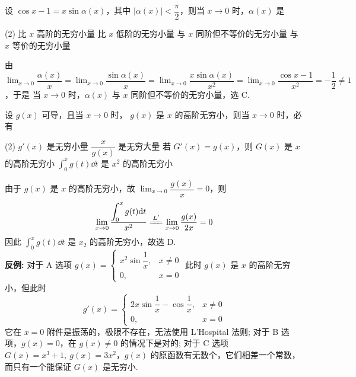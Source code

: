 \begin{example}
    设 $\cos x-1=x\sin\alpha(x)$，其中 $|\alpha(x)|<\dfrac{\pi}{2}$，则当 $x\to0$ 时，$\alpha(x)$ 是
    \begin{tasks}(2)
        \task 比 $x$ 高阶的无穷小量
        \task 比 $x$ 低阶的无穷小量
        \task 与 $x$ 同阶但不等价的无穷小量
        \task 与 $x$ 等价的无穷小量
    \end{tasks}
\end{example}
\begin{solution}
    由 $\displaystyle \lim_{x\to0}\dfrac{\alpha(x)}{x}=\lim_{x\to0}\dfrac{\sin\alpha(x)}{x}=\lim_{x\to0}\dfrac{x\sin\alpha(x)}{x^2}=\lim_{x\to0}\dfrac{\cos x-1}{x^2}=-\dfrac{1}{2}\neq1$，于是
    当 $x\to0$ 时，$\alpha(x)$ 与 $x$ 同阶但不等价的无穷小量，选 C.
\end{solution}

\begin{example}
    设 $g(x)$ 可导，且当 $x\to0$ 时， $g(x)$ 是 $x$ 的高阶无穷小，则当 $x\to0$  时，必有
    \begin{tasks}(2)
        \task $g'(x)$ 是无穷小量
        \task $\dfrac{x}{g(x)}$ 是无穷大量
        \task 若 $G'(x)=g(x)$，则 $G(x)$ 是 $x$ 的高阶无穷小
        \task $\displaystyle\int_{0}^{x}g(t)\dd t$ 是 $x^2$ 的高阶无穷小
    \end{tasks}
\end{example}
\begin{solution}
    由于 $g(x)$ 是 $x$ 的高阶无穷小，故 $\displaystyle\lim_{x\to0}\dfrac{g(x)}{x}=0$，则 $$\displaystyle\lim_{x\to0}\dfrac{\displaystyle\int_{0}^{x}g(t)\dd t}{x^2} \xlongequal{L'}\lim_{x\to0}\dfrac{g(x)}{2x}=0$$
    因此 $\displaystyle\int_{0}^{x}g(t)\dd t$ 是 $x_2$ 的高阶无穷小，故选 D.\\
    \textbf{反例: }对于 A 选项 $g(x)=\begin{cases}
            x^2\sin\dfrac{1}{x}, & x\neq0 \\
            0,                   & x=0
        \end{cases}$ 此时 $g(x)$ 是 $x$ 的高阶无穷小，但此时 $$g'(x)=\begin{cases}
            2x\sin\dfrac{1}{x}-\cos\dfrac{1}{x}, & x\neq0 \\
            0,                                   & x=0
        \end{cases}$$
    它在 $x=0$ 附件是振荡的，极限不存在，无法使用 L'Hospital 法则; 对于 B 选项，$g(x)=0$，在 $g(x)\neq0$ 的情况下是对的; 对于 C 选项 $G(x)=x^3+1,~g(x)=3x^2$，$g(x)$ 的原函数有无数个，它们相差一个常数，而只有一个能保证 $G(x)$ 是无穷小.
\end{solution}

